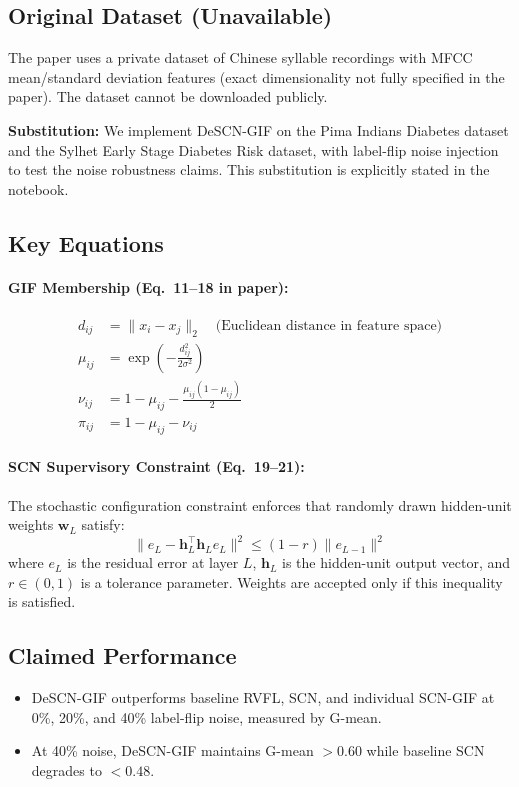 \documentclass[12pt,a4paper]{article}
\begin{document}
\subsection{Original Dataset (Unavailable)}
The paper uses a private dataset of Chinese syllable recordings with MFCC mean/standard deviation features (exact dimensionality not fully specified in the paper). The dataset cannot be downloaded publicly.

\textbf{Substitution:} We implement DeSCN-GIF on the Pima Indians Diabetes dataset and the Sylhet Early Stage Diabetes Risk dataset, with label-flip noise injection to test the noise robustness claims. This substitution is explicitly stated in the notebook.

\subsection{Key Equations}
\paragraph{GIF Membership (Eq.~11--18 in paper):}
\begin{align}
  d_{ij} &= \|x_i - x_j\|_2 \quad\text{(Euclidean distance in feature space)}\\
  \mu_{ij} &= \exp\!\left(-\frac{d_{ij}^2}{2\sigma^2}\right)\\
  \nu_{ij} &= 1 - \mu_{ij} - \frac{\mu_{ij}(1-\mu_{ij})}{2}\\
  \pi_{ij} &= 1 - \mu_{ij} - \nu_{ij}
\end{align}

\paragraph{SCN Supervisory Constraint (Eq.~19--21):}
The stochastic configuration constraint enforces that randomly drawn hidden-unit weights $\boldsymbol{w}_L$ satisfy:
\begin{equation}
  \|e_L - \boldsymbol{h}_L^\top \boldsymbol{h}_L e_L\|^2 \leq (1 - r)\|e_{L-1}\|^2
\end{equation}
where $e_L$ is the residual error at layer $L$, $\boldsymbol{h}_L$ is the hidden-unit output vector, and $r \in (0,1)$ is a tolerance parameter. Weights are accepted only if this inequality is satisfied.

\subsection{Claimed Performance}
\begin{itemize}[leftmargin=*]
  \item DeSCN-GIF outperforms baseline RVFL, SCN, and individual SCN-GIF at 0\%, 20\%, and 40\% label-flip noise, measured by G-mean.
  \item At 40\% noise, DeSCN-GIF maintains G-mean $> 0.60$ while baseline SCN degrades to $< 0.48$.
\end{itemize}
\end{document}

